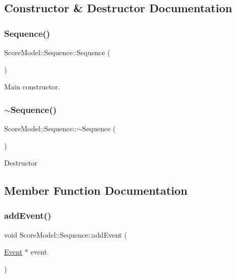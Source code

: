 \subsection{Constructor \& Destructor Documentation}
\mbox{\label{classScoreModel_1_1Sequence_a5b15785389ad4c649ec92ea939b6ed21}} 
\subsubsection{\texorpdfstring{Sequence()}{Sequence()}}
{\footnotesize\ttfamily Score\+Model\+::\+Sequence\+::\+Sequence (\begin{DoxyParamCaption}{ }\end{DoxyParamCaption})}

Main constructor. \mbox{\label{classScoreModel_1_1Sequence_ad35f70d1ec1514a9246555cda8ecd0c8}} 
\subsubsection{\texorpdfstring{$\sim$Sequence()}{~Sequence()}}
{\footnotesize\ttfamily Score\+Model\+::\+Sequence\+::$\sim$\+Sequence (\begin{DoxyParamCaption}{ }\end{DoxyParamCaption})}

Destructor 

\subsection{Member Function Documentation}
\mbox{\label{classScoreModel_1_1Sequence_a45e910adcb963d3cf79bef19ef5f85eb}} 
\subsubsection{\texorpdfstring{addEvent()}{addEvent()}}
{\footnotesize\ttfamily void Score\+Model\+::\+Sequence\+::add\+Event (\begin{DoxyParamCaption}\item[{\mbox{\hyperlink{classScoreModel_1_1Event}{Event}} $\ast$}]{event }\end{DoxyParamCaption})}

